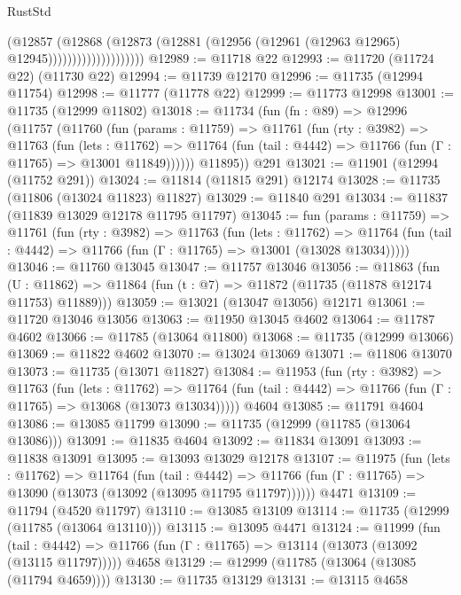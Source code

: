 \begin{lexlean}{RustStd}
\begin{coremodule}
                                (@12857
                                  (@12868
                                    (@12873
                                      (@12881
                                        (@12956 (@12961 (@12963 @12965) @12945))))))))))))))))))))
@12989 := @11718 @22
@12993 := @11720 (@11724 @22) (@11730 @22)
@12994 := @11739 @12170
@12996 := @11735 (@12994 @11754)
@12998 := @11777 (@11778 @22)
@12999 := @11773 @12998
@13001 := @11735 (@12999 @11802)
@13018 := @11734
    (fun (fn : @89) =>
    @12996
      (@11757
        (@11760
          (fun (params : @11759) =>
          @11761
            (fun (rty : @3982) =>
            @11763
              (fun (lets : @11762) =>
              @11764 (fun (tail : @4442) => @11766 (fun (Γ : @11765) => @13001 @11849))))))
        @11895))
    @291
@13021 := @11901 (@12994 (@11752 @291))
@13024 := @11814 (@11815 @291) @12174
@13028 := @11735 (@11806 (@13024 @11823) @11827)
@13029 := @11840 @291
@13034 := @11837 (@11839 @13029 @12178 @11795 @11797)
@13045 := fun (params : @11759) =>
  @11761
    (fun (rty : @3982) =>
    @11763
      (fun (lets : @11762) =>
      @11764 (fun (tail : @4442) => @11766 (fun (Γ : @11765) => @13001 (@13028 @13034)))))
@13046 := @11760 @13045
@13047 := @11757 @13046
@13056 := @11863
    (fun (U : @11862) => @11864 (fun (t : @7) => @11872 (@11735 (@11878 @12174 @11753) @11889)))
@13059 := @13021 (@13047 @13056) @12171
@13061 := @11720 @13046 @13056
@13063 := @11950 @13045 @4602
@13064 := @11787 @4602
@13066 := @11785 (@13064 @11800)
@13068 := @11735 (@12999 @13066)
@13069 := @11822 @4602
@13070 := @13024 @13069
@13071 := @11806 @13070
@13073 := @11735 (@13071 @11827)
@13084 := @11953
    (fun (rty : @3982) =>
    @11763
      (fun (lets : @11762) =>
      @11764 (fun (tail : @4442) => @11766 (fun (Γ : @11765) => @13068 (@13073 @13034)))))
    @4604
@13085 := @11791 @4604
@13086 := @13085 @11799
@13090 := @11735 (@12999 (@11785 (@13064 @13086)))
@13091 := @11835 @4604
@13092 := @11834 @13091
@13093 := @11838 @13091
@13095 := @13093 @13029 @12178
@13107 := @11975
    (fun (lets : @11762) =>
    @11764
      (fun (tail : @4442) =>
      @11766 (fun (Γ : @11765) => @13090 (@13073 (@13092 (@13095 @11795 @11797))))))
    @4471
@13109 := @11794 (@4520 @11797)
@13110 := @13085 @13109
@13114 := @11735 (@12999 (@11785 (@13064 @13110)))
@13115 := @13095 @4471
@13124 := @11999
    (fun (tail : @4442) => @11766 (fun (Γ : @11765) => @13114 (@13073 (@13092 (@13115 @11797)))))
    @4658
@13129 := @12999 (@11785 (@13064 (@13085 (@11794 @4659))))
@13130 := @11735 @13129
@13131 := @13115 @4658

\end{coremodule}
\end{lexlean}
